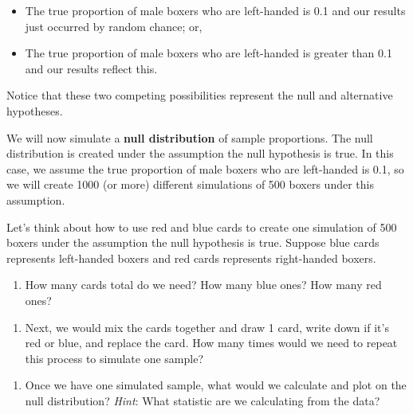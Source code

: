 \documentclass[
]{report}
\providecommand{\tightlist}{%
  \setlength{\itemsep}{0pt}\setlength{\parskip}{0pt}}
\begin{document}
\begin{itemize}
\item
  The true proportion of male boxers who are left-handed is 0.1 and our results just occurred by random chance; or,
\item
  The true proportion of male boxers who are left-handed is greater than 0.1 and our results reflect this.
\end{itemize}

Notice that these two competing possibilities represent the null and alternative hypotheses.

We will now simulate a \textbf{null distribution} of sample proportions. The null distribution is created under the assumption the null hypothesis is true. In this case, we assume the true proportion of male boxers who are left-handed is 0.1, so we will create 1000 (or more) different simulations of 500 boxers under this assumption.

Let's think about how to use red and blue cards to create one simulation of 500 boxers under the assumption the null hypothesis is true. Suppose blue cards represents left-handed boxers and red cards represents right-handed boxers.

\begin{enumerate}
\def\labelenumi{\arabic{enumi}.}
\setcounter{enumi}{14}
\tightlist
\item
  How many cards total do we need? How many blue ones? How many red ones?
\end{enumerate}

\vspace{0.5in}

\begin{enumerate}
\def\labelenumi{\arabic{enumi}.}
\setcounter{enumi}{15}
\tightlist
\item
  Next, we would mix the cards together and draw 1 card, write down if it's red or blue, and replace the card. How many times would we need to repeat this process to simulate one sample?
\end{enumerate}

\vspace{0.5in}

\begin{enumerate}
\def\labelenumi{\arabic{enumi}.}
\setcounter{enumi}{16}
\tightlist
\item
  Once we have one simulated sample, what would we calculate and plot on the null distribution? \emph{Hint}: What statistic are we calculating from the data?
\end{enumerate}
\end{document}
